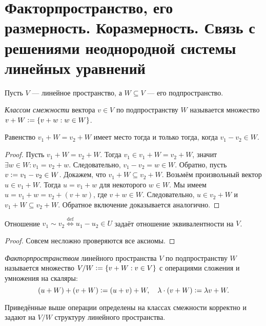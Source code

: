 \section{Факторпространство, его размерность. Коразмерность. Связь с решениями неоднородной системы линейных уравнений}

Пусть $V$ --- линейное пространство, а $W \subseteq V$ --- его подпространство.

\begin{definition}
    \textit{Классом смежности} вектора $v \in V$ по подпространству $W$ называется множество $v + W \vcentcolon = \{v + w : w \in W\}$.
\end{definition}

\begin{lemma}
    Равенство $v_1 + W = v_2 + W$ имеет место тогда и только тогда, когда $v_1 - v_2 \in W$.
\end{lemma}

\begin{proof}
    Пусть $v_1 + W = v_2 + W$. Тогда $v_1 \in v_1 + W = v_2 + W$, значит $\exists w \in W: v_1 = v_2 + w$. Следовательно, $v_1 - v_2 = w \in W$. Обратно, пусть $v \vcentcolon = v_1 - v_2 \in W$. Докажем, что $v_1 + W \subseteq v_2 + W$. Возьмём произвольный вектор $u \in v_1 + W$. Тогда $u = v_1 + w$ для некоторого $w \in W$. Мы имеем $u = v_1 + w = v_2 + (v + w)$, где $v + w \in W$. Следовательно, $u \in v_2 + W$ и $v_1 + W \subseteq v_2 + W$. Обратное включение доказывается аналогично.
\end{proof}

\begin{proposal}
    Отношение $v_1 \sim v_2 \overset{\mathrm{def}}{\Longleftrightarrow} u_1 - u_2 \in U$ задаёт отношение эквивалентности на $V$.
\end{proposal}

\begin{proof}
    Совсем несложно проверяются все аксиомы.
\end{proof}

\begin{definition}
    \textit{Факторпространством} линейного пространства $V$ по подпространству $W$ называется множество $V / W \vcentcolon = \{v + W : v \in V\}$ с операциями сложения и умножения на скаляры:
    \[
        (u + W) + (v + W) \vcentcolon = (u + v) + W,\quad \lambda \cdot (v + W) \vcentcolon = \lambda v + W.
    \]
\end{definition}

\begin{proposal}
    Приведённые выше операции определены на классах смежности корректно и задают на $V / W$ структуру линейного пространства.
\end{proposal}

